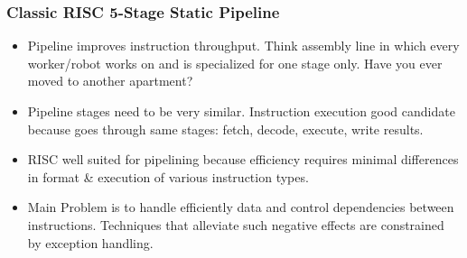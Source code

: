 \documentclass{beamer}
\newcommand{\emp}[1]{\textcolor{DikuRed}{ #1}}
\begin{document}
\begin{frame}[fragile,t]
\frametitle{Classic RISC 5-Stage Static Pipeline}

\begin{itemize}
\item Pipeline improves instruction throughput. Think assembly line in 
        which every worker/robot works on and is specialized for one 
        stage only. Have you ever moved to another apartment?\bigskip

\item Pipeline stages need to be very similar. Instruction execution good
        candidate because goes through same stages: fetch, decode, execute, 
        write results.\bigskip

\item RISC well suited for pipelining because efficiency requires minimal
        differences in format \& execution of various instruction types.\bigskip

\item \emp{Main Problem} is to handle efficiently data and control dependencies
        between instructions.  Techniques that alleviate such negative effects
        are constrained by exception handling.
\end{itemize}

\end{frame}
\end{document}
